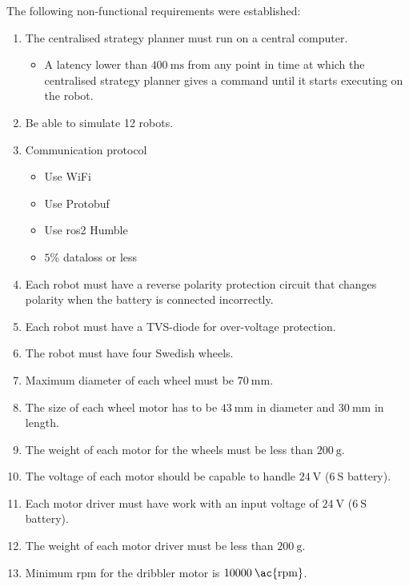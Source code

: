 The following non-functional requirements were established:
\begin{enumerate}
    \item The centralised strategy planner must run on a central computer.
    \begin{itemize}
        \item A latency lower than $400\:\text{ms}$ from any point in time at which the centralised strategy planner gives a command until it starts executing on the robot.
    \end{itemize}
    \item Be able to simulate 12 robots.
    \item Communication protocol
    \begin{itemize}
        \item Use WiFi
        \item Use Protobuf
        \item Use \ac{ros2} Humble
        \item $5\%$ dataloss or less
    \end{itemize}
    \item Each robot must have a reverse polarity protection circuit that changes polarity when the battery is connected incorrectly.
    \item Each robot must have a TVS-diode for over-voltage protection.
    \item The robot must have four Swedish wheels.
    \item Maximum diameter of each wheel must be $70\:\text{mm}$.
    \item The size of each wheel motor has to be $43\:\text{mm}$ in diameter and $30\:\text{mm}$ in length.
    \item The weight of each motor for the wheels must be less than $200\:\text{g}$.
    \item The voltage of each motor should be capable to handle $24\:\text{V}$ ($6\:\text{S}$ battery).
    \item Each motor driver must have work with an input voltage of $24\:\text{V}$ ($6\:\text{S}$ battery).
    \item The weight of each motor driver must be less than $200\:\text{g}$.
    \item Minimum \ac{rpm} for the dribbler motor is $10000\:\text{\ac{rpm}}$.

\end{enumerate}

